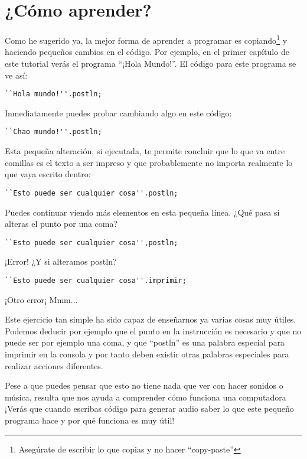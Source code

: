 \section{¿Cómo aprender?}

Como he sugerido ya, la mejor forma de aprender a programar es copiando\footnote{Asegúrate de escribir lo que copias y no hacer ``copy-paste''} y haciendo pequeños cambios en el código. Por ejemplo, en el primer capítulo de este tutorial verás el programa ``¡Hola Mundo!''. El código para este programa se ve así:

\begin{lstlisting}
``Hola mundo!''.postln;
\end{lstlisting}

Inmediatamente puedes probar cambiando algo en este código:

\begin{lstlisting}
``Chao mundo!''.postln;
\end{lstlisting}

Esta pequeña alteración, si ejecutada, te permite concluir que lo que va entre comillas es el texto a ser impreso y que probablemente no importa realmente lo que vaya escrito dentro:

\begin{lstlisting}
``Esto puede ser cualquier cosa''.postln;
\end{lstlisting}

Puedes continuar viendo más elementos en esta pequeña línea. ¿Qué pasa si alteras el punto por una coma?

\begin{lstlisting}
``Esto puede ser cualquier cosa'',postln; 
\end{lstlisting}

¡Error! ¿Y si alteramos postln?

\begin{lstlisting}
``Esto puede ser cualquier cosa''.imprimir; 
\end{lstlisting}

¡Otro error¡ Mmm... 

Este ejercicio tan simple ha sido capaz de enseñarnos ya varias cosas muy útiles. Podemos deducir por ejemplo que el punto en la instrucción es necesario y que no puede ser por ejemplo una coma, y que ``postln'' es una palabra especial para imprimir en la consola y por tanto deben existir otras palabras especiales para realizar acciones diferentes. 

Pese a que puedes pensar que esto no tiene nada que ver con hacer sonidos o música, resulta que nos ayuda a comprender cómo funciona una computadora ¡Verás que cuando escribas código para generar audio saber lo que este pequeño programa hace y por qué funciona es muy útil!

